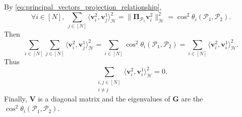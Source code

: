 \documentclass[twoside,11pt]{book}
\numberwithin{theorem}{chapter}
\numberwithin{definition}{chapter}
\numberwithin{proposition}{chapter}
\numberwithin{corollary}{chapter}
\numberwithin{example}{chapter}
\numberwithin{lemma}{chapter}
\begin{document}
By \eqref{eq:principal_vectors_projection_relationship},
\begin{equation}
\forall i \in [N], \:\sum\limits_{j \in [N]} \langle \bm{v}_{i}^{2}, \bm{v}_{j}^{1}\rangle_{\mathcal{H}}^{2} = \|\bm{\Pi}_{\mathcal{P}_{1}}\bm{v}_{i}^{2}\|_{\mathcal{H}}^{2} = \cos^{2} \theta_{i}(\mathcal{P}_{1},\mathcal{P}_{2}).
\end{equation}
Then
\begin{equation}
 \sum\limits_{i \in [N]}\sum\limits_{j \in [N]} \langle \bm{v}_{i}^{2}, \bm{v}_{j}^{1}\rangle_{\mathcal{H}}^{2} = \sum\limits_{i \in [N]} \cos^{2} \theta_{i}(\mathcal{P}_{1},\mathcal{P}_{2}) = \sum\limits_{i \in [N]} \langle \bm{v}_{i}^{2}, \bm{v}_{i}^{1}\rangle_{\mathcal{H}}^{2} .
\end{equation}
Thus
\begin{equation}
\sum\limits_{\substack{i,j \in [N]\\ i \neq j}} \langle \bm{v}_{i}^{2}, \bm{v}_{i}^{1}\rangle_{\mathcal{H}}^{2} = 0 .
\end{equation}
Finally, $\bm{V}$ is a diagonal matrix and the eigenvalues of $\bm{G}$ are the $\cos^{2} \theta_{i}(\mathcal{P}_{1},\mathcal{P}_{2})$.
\end{document}
